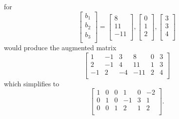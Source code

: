 \documentclass{article}
\begin{document}
    for 
    \[
    \begin{bmatrix}
        b_1 \\
        b_2 \\
        b_3 \\
    \end{bmatrix}
    =
    \begin{bmatrix}
        8 \\
        11 \\
        -11 \\
    \end{bmatrix},
    \begin{bmatrix}
        0 \\
        1 \\
        2 \\
    \end{bmatrix},
    \begin{bmatrix}
        3 \\
        3 \\
        4 \\
    \end{bmatrix}
    \]
    would produce the augmented matrix
    \[
    \begin{bmatrix}
        1 & -1 & 3 & 8 & 0 & 3 \\
        2 & -1 & 4 & 11 & 1 & 3 \\
        -1 & 2 & -4 & -11 & 2 & 4 \\
    \end{bmatrix}
    \]
    which simplifies to 
    \[
    \begin{bmatrix}
        1 & 0 & 0 & 1 & 0 & -2 \\
        0 & 1 & 0 & -1 & 3 & 1 \\
        0 & 0 & 1 & 2 & 1 & 2 \\
    \end{bmatrix}.
    \]
\end{document}
